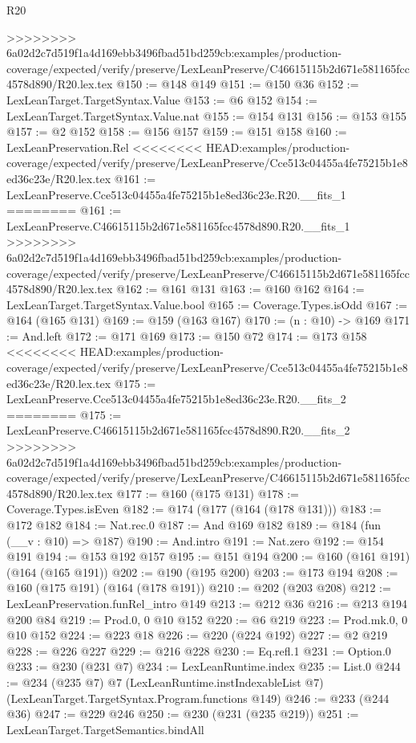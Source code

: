 \begin{lexlean}{R20}
\begin{coremodule}
{{{{{{{{{{{>>>>>>>> 6a02d2c7d519f1a4d169ebb3496fbad51bd259cb:examples/production-coverage/expected/verify/preserve/LexLeanPreserve/C46615115b2d671e581165fcc4578d890/R20.lex.tex
@150 := @148 @149
@151 := @150 @36
@152 := LexLeanTarget.TargetSyntax.Value
@153 := @6 @152
@154 := LexLeanTarget.TargetSyntax.Value.nat
@155 := @154 @131
@156 := @153 @155
@157 := @2 @152
@158 := @156 @157
@159 := @151 @158
@160 := LexLeanPreservation.Rel
<<<<<<<< HEAD:examples/production-coverage/expected/verify/preserve/LexLeanPreserve/Cce513c04455a4fe75215b1e8ed36c23e/R20.lex.tex
@161 := LexLeanPreserve.Cce513c04455a4fe75215b1e8ed36c23e.R20.__fits_1
========
@161 := LexLeanPreserve.C46615115b2d671e581165fcc4578d890.R20.__fits_1
>>>>>>>> 6a02d2c7d519f1a4d169ebb3496fbad51bd259cb:examples/production-coverage/expected/verify/preserve/LexLeanPreserve/C46615115b2d671e581165fcc4578d890/R20.lex.tex
@162 := @161 @131
@163 := @160 @162
@164 := LexLeanTarget.TargetSyntax.Value.bool
@165 := Coverage.Types.isOdd
@167 := @164 (@165 @131)
@169 := @159 (@163 @167)
@170 := (n : @10) -> @169
@171 := And.left
@172 := @171 @169
@173 := @150 @72
@174 := @173 @158
<<<<<<<< HEAD:examples/production-coverage/expected/verify/preserve/LexLeanPreserve/Cce513c04455a4fe75215b1e8ed36c23e/R20.lex.tex
@175 := LexLeanPreserve.Cce513c04455a4fe75215b1e8ed36c23e.R20.__fits_2
========
@175 := LexLeanPreserve.C46615115b2d671e581165fcc4578d890.R20.__fits_2
>>>>>>>> 6a02d2c7d519f1a4d169ebb3496fbad51bd259cb:examples/production-coverage/expected/verify/preserve/LexLeanPreserve/C46615115b2d671e581165fcc4578d890/R20.lex.tex
@177 := @160 (@175 @131)
@178 := Coverage.Types.isEven
@182 := @174 (@177 (@164 (@178 @131)))
@183 := @172 @182
@184 := Nat.rec.{0}
@187 := And @169 @182
@189 := @184 (fun (__v : @10) => @187)
@190 := And.intro
@191 := Nat.zero
@192 := @154 @191
@194 := @153 @192 @157
@195 := @151 @194
@200 := @160 (@161 @191) (@164 (@165 @191))
@202 := @190 (@195 @200)
@203 := @173 @194
@208 := @160 (@175 @191) (@164 (@178 @191))
@210 := @202 (@203 @208)
@212 := LexLeanPreservation.funRel_intro @149
@213 := @212 @36
@216 := @213 @194 @200 @84
@219 := Prod.{0, 0} @10 @152
@220 := @6 @219
@223 := Prod.mk.{0, 0} @10 @152
@224 := @223 @18
@226 := @220 (@224 @192)
@227 := @2 @219
@228 := @226 @227
@229 := @216 @228
@230 := Eq.refl.{1}
@231 := Option.{0}
@233 := @230 (@231 @7)
@234 := LexLeanRuntime.index
@235 := List.{0}
@244 := @234
    (@235 @7)
    @7
    (LexLeanRuntime.instIndexableList @7)
    (LexLeanTarget.TargetSyntax.Program.functions @149)
@246 := @233 (@244 @36)
@247 := @229 @246
@250 := @230 (@231 (@235 @219))
@251 := LexLeanTarget.TargetSemantics.bindAll
}}}}}}}}}}}
\end{coremodule}
\end{lexlean}
